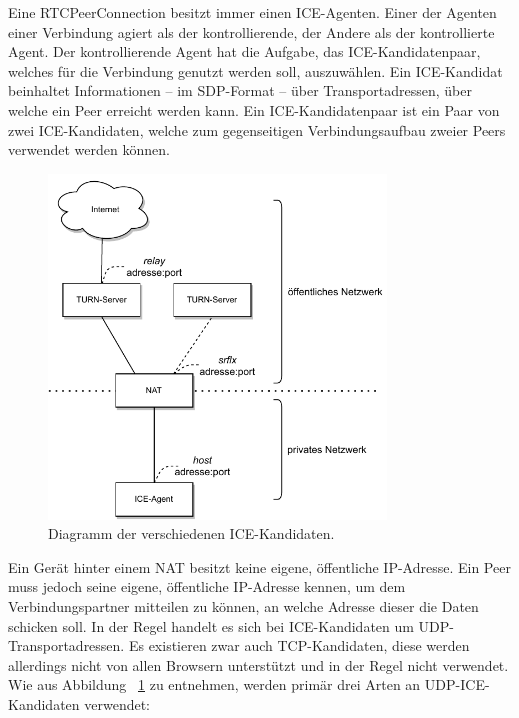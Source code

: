 Eine RTCPeerConnection besitzt immer einen \acs{ICE}-Agenten. Einer der Agenten einer Verbindung agiert als der kontrollierende, der Andere als der kontrollierte Agent. Der kontrollierende Agent hat die Aufgabe, das \acs{ICE}-Kandidatenpaar, welches für die Verbindung genutzt werden soll, auszuwählen. Ein \acs{ICE}-Kandidat beinhaltet Informationen -- im \acs{SDP}-Format -- über Transportadressen, über welche ein Peer erreicht werden kann. Ein \acs{ICE}-Kandidatenpaar ist ein Paar von zwei \acs{ICE}-Kandidaten, welche zum gegenseitigen Verbindungsaufbau zweier Peers verwendet werden können.

\begin{figure}[h]
\centering
\includegraphics[width=0.80\textwidth]{bilder/PDF_SVG/CANDIDATES_OLD.pdf}
\caption{Diagramm der verschiedenen \acs{ICE}-Kandidaten.}
\label{fig:icecandidates}
\end{figure}

Ein Gerät hinter einem \acs{NAT} besitzt keine eigene, öffentliche \acs{IP}-Adresse. Ein Peer muss jedoch seine eigene, öffentliche \acs{IP}-Adresse kennen, um dem Verbindungspartner mitteilen zu können, an welche Adresse dieser die Daten schicken soll. In der Regel handelt es sich bei \acs{ICE}-Kandidaten um \acs{UDP}-Transportadressen. Es existieren zwar auch \acs{TCP}-Kandidaten, diese werden allerdings nicht von allen Browsern unterstützt und in der Regel nicht verwendet. Wie aus Abbildung ~\ref{fig:icecandidates} zu entnehmen, werden primär drei Arten an \acs{UDP}-\acs{ICE}-Kandidaten verwendet:

